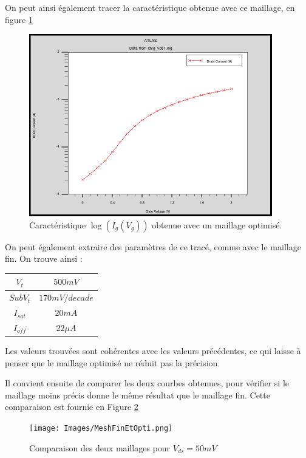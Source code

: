 \documentclass[a4paper,11pt]{report}
\begin{document}
On peut ainsi également tracer la caractéristique obtenue avec ce maillage, en figure \ref{logIdVgmeshopti}

\begin{figure}[H]
    \centering
    \includegraphics[width=300pt]{../meshOpti1/Log.png}
    \caption{Caractéristique $\log(I_g(V_g))$ obtenue avec un maillage optimisé.}
    \label{logIdVgmeshopti}
\end{figure}

On peut également extraire des paramètres de ce tracé, comme avec le maillage fin. On trouve ainsi :

\begin{tableau}[H]
\centering
\begin{tabular}{|c|c|}
\hline
$V_t$&$500mV$\\
\hline
$SubV_t$&$170mV/decade$\\
\hline
$I_{sat}$&$20mA$\\
\hline
$I_{off}$&$22\mu A$\\
\hline
\end{tabular}
\caption{Caractéristiques avec un maillage optimisé avec $V_{ds}=50mV$}
\end{tableau}

Les valeurs trouvées sont cohérentes avec les valeurs précédentes, ce qui laisse à penser que le maillage optimisé ne réduit pas la précision

Il convient ensuite de comparer les deux courbes obtenues, pour vérifier si le maillage moins précis donne le même résultat que le maillage fin. Cette comparaison est fournie en Figure \ref{compMesh}

\begin{figure}[H]
  \centering
  \texttt{[image: Images/MeshFinEtOpti.png]}
  \caption{Comparaison des deux maillages pour $V_{ds}=50mV$}
  \label{compMesh}
\end{figure}
\end{document}
